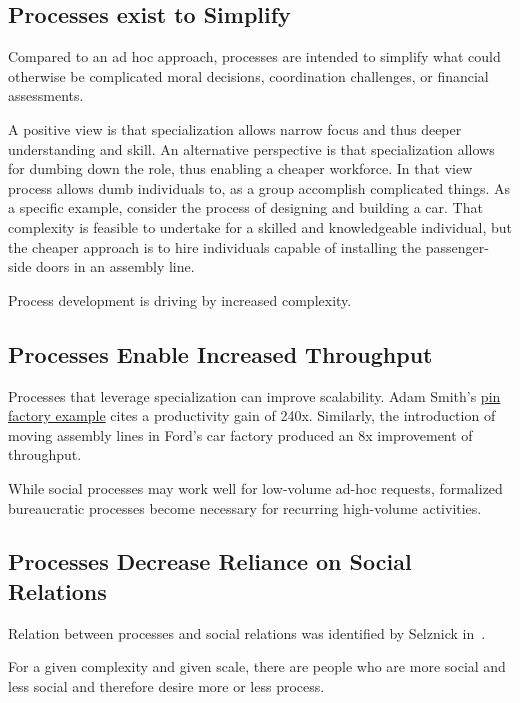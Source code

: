\subsection*{Processes exist to Simplify}
Compared to an ad hoc approach, processes are intended to simplify what could otherwise be complicated moral decisions, coordination challenges, or financial assessments. %



A positive view is that specialization allows narrow focus and thus deeper understanding and skill. An alternative perspective is that specialization allows for dumbing down the role, thus enabling a cheaper workforce. In that view process allows dumb individuals to, as a group accomplish complicated things.  As a specific example, consider the process of designing and building a car. That complexity is feasible to undertake for a skilled and knowledgeable individual, but the cheaper approach is to hire individuals capable of installing the passenger-side doors in an assembly line.

Process development is driving by increased complexity.

\subsection*{Processes Enable Increased Throughput}

Processes that leverage specialization can improve scalability. Adam Smith's \href{https://en.wikipedia.org/wiki/Business_process#Adam_Smith}{pin factory example} cites a productivity gain of 240x. Similarly, the introduction of moving assembly lines in Ford's car factory produced an 8x improvement of throughput. 

While social processes may work well for low-volume ad-hoc requests, formalized bureaucratic processes become necessary for recurring high-volume activities.

\subsection*{Processes Decrease Reliance on Social Relations}

Relation between processes and social relations was identified by Selznick in~\cite{1943_Selznick}.

For a given complexity and given scale, there are people who are more social and less social and therefore desire more or less process.

